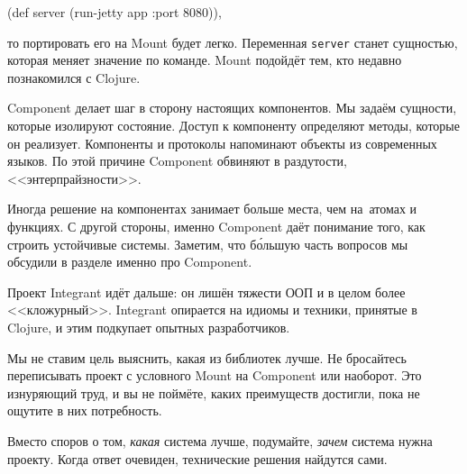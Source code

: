 \else

\begin{english}
  \begin{clojure}
(def server (run-jetty app {:port 8080})),
  \end{clojure}
\end{english}

\fi

\noindent
то портировать его на Mount будет легко. Переменная \verb|server| станет
сущностью, которая меняет значение по команде. Mount подойдёт тем, кто недавно
познакомился с Clojure.

Component делает шаг в сторону настоящих компонентов. Мы задаём сущности, которые
изолируют состояние. Доступ к компоненту определяют методы, которые он
реализует. Компоненты и протоколы напоминают объекты из современных языков. По
этой причине Component обвиняют в раздутости, <<энтерпрайзности>>.

Иногда решение на компонентах занимает больше места, чем на~атомах и функциях. С
другой стороны, именно Component даёт понимание того, как строить устойчивые
системы. Заметим, что б\'{о}льшую часть вопросов мы обсудили в разделе именно
про Component.

Проект Integrant идёт дальше: он лишён тяжести ООП и в целом более
<<кложурный>>. Integrant опирается на идиомы и техники, принятые в Clojure, и
этим подкупает опытных разработчиков.

Мы не ставим цель выяснить, какая из библиотек лучше. Не бросайтесь переписывать
проект с условного Mount на Component или наоборот. Это изнуряющий труд, и вы не
поймёте, каких преимуществ достигли, пока не ощутите в них потребность.

Вместо споров о том, \emph{какая} система лучше, подумайте, \emph{зачем} система
нужна проекту. Когда ответ очевиден, технические решения найдутся сами.
